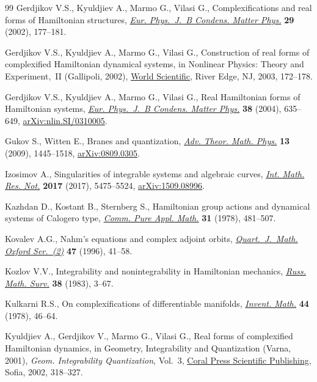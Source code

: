 \documentclass[pdftex]{sigma}
\numberwithin{equation}{section}
\begin{document}
\begin{thebibliography}{99}
Gerdjikov V.S., Kyuldjiev A., Marmo G., Vilasi G., Complexifications and real
 forms of {H}amiltonian structures, \href{https://doi.org/10.1140/epjb/e2002-00281-y}{\textit{Eur. Phys.~J.~B Condens. Matter
 Phys.}} \textbf{29} (2002), 177--181.

Gerdjikov V.S., Kyuldjiev A., Marmo G., Vilasi G., Construction of real forms
 of complexified {H}amiltonian dynamical systems, in Nonlinear Physics: Theory
 and Experiment,~{II} ({G}allipoli, 2002), \href{https://doi.org/10.1142/9789812704467_0024}{World Scientific}, River Edge, NJ,
 2003, 172--178.

Gerdjikov V.S., Kyuldjiev A., Marmo G., Vilasi G., Real {H}amiltonian forms of
 {H}amiltonian systems, \href{https://doi.org/10.1140/epjb/e2004-00158-1}{\textit{Eur. Phys.~J.~B Condens. Matter Phys.}}
 \textbf{38} (2004), 635--649, \href{https://arxiv.org/abs/nlin.SI/0310005}{arXiv:nlin.SI/0310005}.

Gukov S., Witten E., Branes and quantization, \href{https://doi.org/10.4310/atmp.2009.v13.n5.a5}{\textit{Adv. Theor. Math. Phys.}}
 \textbf{13} (2009), 1445--1518, \href{https://arxiv.org/abs/0809.0305}{arXiv:0809.0305}.

Izosimov A., Singularities of integrable systems and algebraic curves,
 \href{https://doi.org/10.1093/imrn/rnw168}{\textit{Int. Math. Res. Not.}} \textbf{2017} (2017), 5475--5524,
 \href{https://arxiv.org/abs/1509.08996}{arXiv:1509.08996}.

Kazhdan D., Kostant B., Sternberg S., Hamiltonian group actions and dynamical
 systems of {C}alogero type, \href{https://doi.org/10.1002/cpa.3160310405}{\textit{Comm. Pure Appl. Math.}} \textbf{31}
 (1978), 481--507.

Kovalev A.G., Nahm's equations and complex adjoint orbits,
 \href{https://doi.org/10.1093/qmath/47.1.41}{\textit{Quart.~J.~Math. Oxford Ser.~(2)}} \textbf{47} (1996), 41--58.

Kozlov V.V., Integrability and nonintegrability in {H}amiltonian mechanics,
 \href{https://doi.org/10.1070/RM1983v038n01ABEH003330}{\textit{Russ. Math. Surv.}} \textbf{38} (1983), 3--67.

Kulkarni R.S., On complexifications of differentiable manifolds,
 \href{https://doi.org/10.1007/BF01389901}{\textit{Invent. Math.}} \textbf{44} (1978), 46--64.

Kyuldjiev A., Gerdjikov V., Marmo G., Vilasi G., Real forms of complexified
 {H}amiltonian dynamics, in Geometry, Integrability and Quantization ({V}arna,
 2001), \textit{Geom. Integrability Quantization}, Vol.~3, \href{https://doi.org/10.7546/giq-3-2002-318-327}{Coral Press
 Scientific Publishing}, Sofia, 2002, 318--327.


\end{thebibliography}
\end{document}
